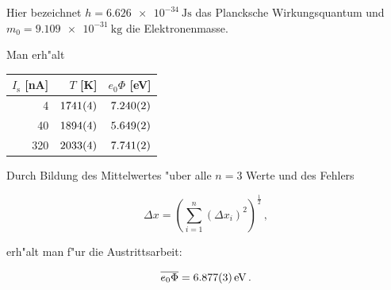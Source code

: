 		Hier bezeichnet $h = \SI{6.626e-34}{\joule \second}$ \cite{nist} das Plancksche Wirkungsquantum und $m_0 = \SI{9.109e-31}{\kilo \gram}$ \cite{nist} die Elektronenmasse.

		\clearpage

		Man erh"alt

		\begin{table}[h!]
			\begin{center}
				\label{messung1}
				\begin{tabular}{|r|r|r|}
					\hline
						$I_\mathrm{s}$ [nA] & $T$ [K] & $e_0 \Phi$ [eV] \\
					\hline 
					\hline
						4 & $\SI{1741 (4)}{}$ & $\SI{7.240 (2)}{}$\\
						40 & $\SI{1894 (4)}{}$ & $\SI{5.649 (2)}{}$ \\
						320 & $\SI{2033 (4)}{}$ & $\SI{7.741 (2)}{}$ \\
					\hline 
				\end{tabular}
			\end{center}
		\end{table}

		Durch Bildung des Mittelwertes "uber alle $n = 3$ Werte und des Fehlers

		\begin{equation*}
			\Delta x = \left(\sum_{i=1}^{n} (\Delta x_i)^2\right)^{\frac{1}{2}}\,,
		\end{equation*}

		erh"alt man f"ur die Austrittsarbeit:

		\begin{eqnarray*}
			\overline{e_0 \Phi} = \SI{6.877 (3)}{\electronvolt}\,.
		\end{eqnarray*}

